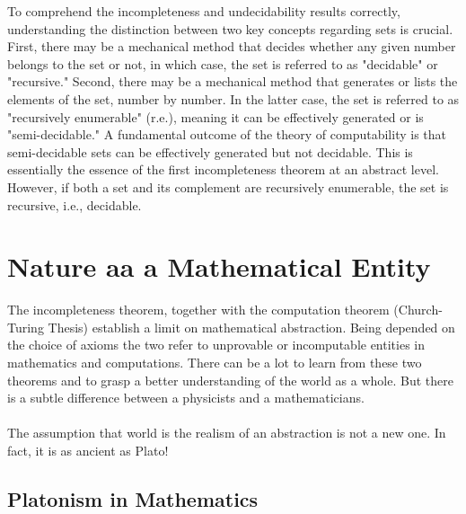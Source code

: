 \documentclass[10pt,a4paper]{article}
\newcounter{theo}
\begin{document}
                            To comprehend the incompleteness and undecidability results correctly, understanding the distinction between two key concepts regarding sets is crucial. First, there may be a mechanical method that decides whether any given number belongs to the set or not, in which case, the set is referred to as "decidable" or "recursive." Second, there may be a mechanical method that generates or lists the elements of the set, number by number. In the latter case, the set is referred to as "recursively enumerable" (r.e.), meaning it can be effectively generated or is "semi-decidable." A fundamental outcome of the theory of computability is that semi-decidable sets can be effectively generated but not decidable. This is essentially the essence of the first incompleteness theorem at an abstract level. However, if both a set and its complement are recursively enumerable, the set is recursive, i.e., decidable.\cite{sep-church-turing}
            \section{Nature aa a Mathematical Entity}
                The incompleteness theorem, together with the computation theorem (Church-Turing Thesis) establish a limit on mathematical abstraction. Being depended on the choice of axioms the two refer to unprovable or incomputable entities in mathematics and computations. There can be a lot to learn from these two theorems and to grasp a better understanding of the world as a whole. But there is a subtle difference between a physicists and a mathematicians. 
                \\
                \\
                The assumption that world is the realism of an abstraction is not a new one. In fact, it is as ancient as Plato! 
                \subsection{Platonism in Mathematics}
\end{document}
